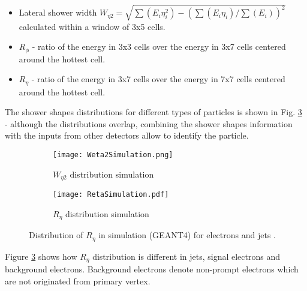   \begin{itemize}
  	\item Lateral shower width $W_{\eta 2} = \sqrt{\sum(E_i \eta^{2}_{i})-(\sum(E_i \eta_{i})/\sum(E_i))^2}$ calculated within a window of 3x5 cells.
  	\item $R_{\phi}$ - ratio of the energy in 3x3 cells over the energy in 3x7 cells centered around the hottest cell.
  	\item $R_{\eta}$ - ratio of the energy in 3x7 cells over the energy in 7x7 cells centered around the hottest cell.
  \end{itemize}
  
  The shower shapes distributions for different types of particles is shown in Fig. \ref{fig::sshapes_simul} - although the distributions overlap, combining the shower shapes information with the inputs from other detectors allow to identify the particle.  
    	\begin{figure}[htbp]
	\begin{subfigure}[t]{0.4\textwidth}
		\texttt{[image: Weta2Simulation.png]}
		\caption[ $W_{\eta 2}$]{$W_{\eta 2}$ distribution simulation}
		\label{fig::weta2_simul}
	\end{subfigure}
	\hfill
	\begin{subfigure}[t]{0.39\textwidth} 
		\texttt{[image: RetaSimulation.pdf]}
		\caption[ $R_{\eta}$]{$R_{\eta}$ distribution simulation}
		\label{fig::reta_simul}
	\end{subfigure}
  	\caption{Distribution of $R_{\eta}$ in simulation (GEANT4) for electrons and jets \cite{sshapes_simulation}.}
	\label{fig::sshapes_simul}
\end{figure}

  Figure \ref{fig::sshapes_simul} shows how $R_{\eta}$ distribution is different in jets, signal electrons and background electrons. Background electrons denote non-prompt electrons which are not originated from primary vertex. \\
 
